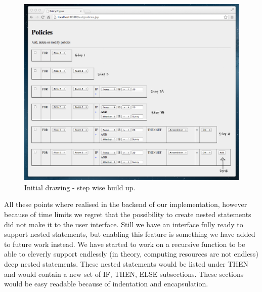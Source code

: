 \begin{figure}[ht]
\centering
\includegraphics[width=\columnwidth]{building_policy_steps.png}
\caption{Initial drawing - step wise build up.}
\label{fig:initialidea:policysteps}
\end{figure}

All these points where realised in the backend of our implementation, however because of time limits we regret that the possibility to create nested statements did not make it to the user interface. Still we have an interface fully ready to support nested statements, but enabling this feature is something we have added to future work instead. We have started to work on a recursive function to be able to cleverly support endlessly (in theory, computing resources are not endless) deep nested statements. These nested statements would be listed under THEN and would contain a new set of IF, THEN, ELSE subsections. These sections would be easy readable because of indentation and encapsulation.

